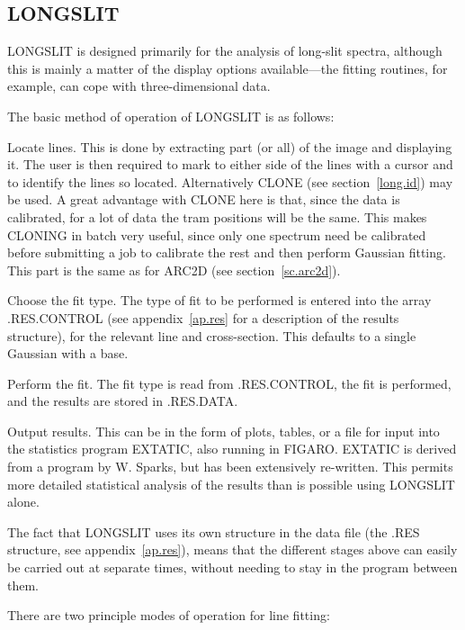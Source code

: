 \subsection{LONGSLIT}
\label{sec.long}

LONGSLIT is designed primarily for the analysis of long-slit spectra,
although this is mainly a matter of the display options available---the
fitting routines, for example, can cope with three-dimensional data.

The basic method of operation of LONGSLIT is as follows:

\begin{list}{()}{}
\item Locate lines.
This is done by extracting part (or all) of the image and displaying
it.
The user is then required to mark to either side of the lines with a
cursor and to identify the lines so located.
Alternatively CLONE (see section~\ref{long.id}) may be used.
A great advantage with CLONE here is that, since the data
is calibrated, for a lot of data the tram positions will be the same.
This makes CLONING in batch very useful, since only one spectrum
need be calibrated before submitting a job to calibrate the rest and
then perform Gaussian fitting.
This part is the same as for ARC2D (see section~\ref{sc.arc2d}).
\item Choose the fit type.
The type of fit to be performed is entered into the array .RES.CONTROL
(see appendix~\ref{ap.res} for a description of the results structure),
for the relevant line and cross-section.
This defaults to a single Gaussian with a base.
\item Perform the fit.
The fit type is read from .RES.CONTROL, the fit is performed, and the
results are stored in .RES.DATA.
\item Output results.
This can be in the form of plots, tables, or a file for input into the
statistics program EXTATIC, also running in FIGARO\@.
EXTATIC is derived from a program by W. Sparks, but has been extensively
re-written.
This permits more detailed statistical analysis of the results than is
possible using LONGSLIT alone.
\end{list}

The fact that LONGSLIT uses its own structure in the data file
(the .RES structure, see appendix~\ref{ap.res}), means that the different stages above
can easily be carried out at separate times, without needing to stay in
the program between them.

There are two principle modes of operation for line fitting:

